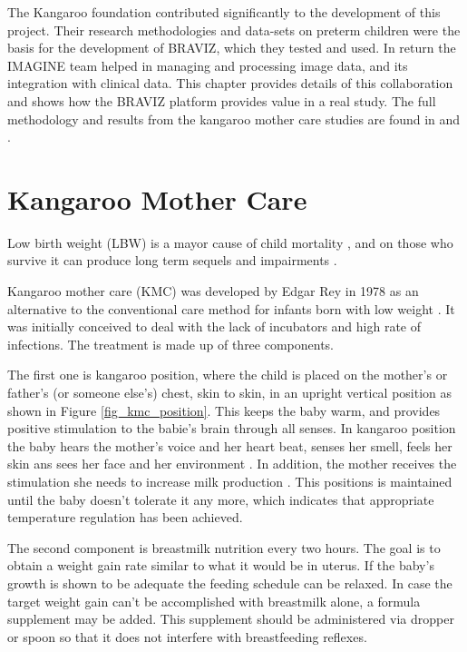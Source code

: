 \label{chap_kmc400}

The Kangaroo foundation contributed significantly to the development of this project. Their research methodologies and data-sets on preterm children were the basis for the development of BRAVIZ, which they tested and used. In return the IMAGINE team helped in managing and processing image data, and its integration with clinical data. This chapter provides details of this collaboration and shows how the BRAVIZ platform provides value in a real study. The full methodology and results from the kangaroo mother care studies are found in \autocite{schneider_cerebral_2012} and \autocite{charpak_final_2015}.

\section{Kangaroo Mother Care}

Low birth weight (LBW) is a mayor cause of child mortality \autocite{wardlaw_low_2005}, and on those who survive it can produce long term sequels and impairments \autocite{nosarti_neurodevelopmental_2010}. 

Kangaroo mother care (KMC) was developed by Edgar Rey in 1978 \autocite{rey_rational_1983} as an alternative to the conventional care method for infants born with low weight \autocite{conde-agudelo_kangaroo_2003}. It was initially conceived to deal with the lack of incubators and high rate of infections. The treatment is made up of three components.

The first one is kangaroo position, where the child is placed on the mother's or father's (or someone else's) chest, skin to skin, in an upright vertical position as shown in Figure \ref{fig_kmc_position}. This keeps the baby warm, and provides positive stimulation to the babie's brain through all senses. In kangaroo position the baby hears the mother's voice and her heart beat, senses her smell, feels her skin ans sees her face and her environment \autocite{tessier_kangaroo_2003}. In addition, the mother receives the stimulation she needs to increase milk production \autocite{charpak_kangaroo_2005}. This positions is maintained until the baby doesn't tolerate it any more, which indicates that appropriate temperature regulation has been achieved. 

The second component is breastmilk nutrition every two hours. The goal is to obtain a weight gain rate similar to what it would be in uterus. If the baby's growth is shown to be adequate the feeding schedule can be relaxed. In case the target weight gain can't be accomplished with breastmilk alone, a formula supplement may be added. This supplement should be administered via dropper or spoon so that it does not interfere with breastfeeding reflexes.

